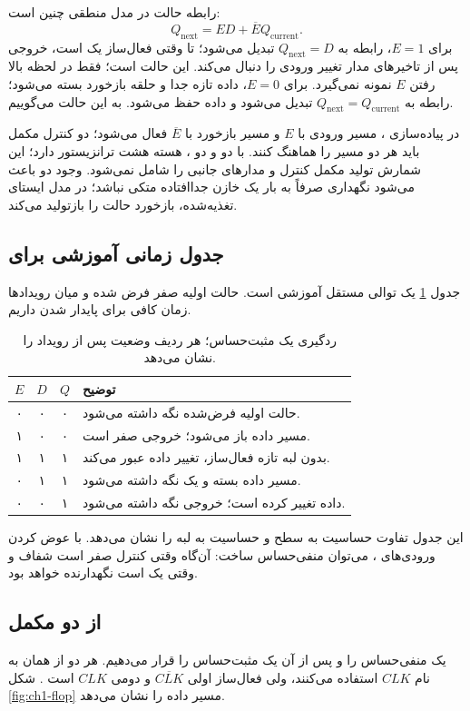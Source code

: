 رابطه حالت در مدل منطقی چنین است:
\begin{equation}\label{eq:ch1-latch}
Q_{\mathrm{next}}=ED+\overline{E}Q_{\mathrm{current}}.
\end{equation}
برای \(E=1\)، رابطه به \(Q_{\mathrm{next}}=D\) تبدیل می‌شود؛
تا وقتی فعال‌ساز یک است، خروجی پس از تاخیرهای مدار تغییر ورودی را دنبال می‌کند.
این حالت  است؛  فقط در لحظه بالا رفتن \(E\) نمونه نمی‌گیرد.
برای \(E=0\)، داده تازه جدا و حلقه بازخورد بسته می‌شود؛
رابطه به \(Q_{\mathrm{next}}=Q_{\mathrm{current}}\) تبدیل می‌شود و داده حفظ می‌شود.
به این حالت  می‌گوییم.

در پیاده‌سازی ، مسیر ورودی با \(E\) و مسیر بازخورد با \(\overline{E}\)
فعال می‌شود؛ دو کنترل مکمل باید هر دو مسیر را هماهنگ کنند.
با دو  و دو ، هسته هشت ترانزیستور دارد؛
این شمارش تولید مکمل کنترل و مدارهای جانبی را شامل نمی‌شود.
وجود دو  باعث می‌شود نگهداری صرفاً به بار یک خازن جداافتاده متکی نباشد؛
در مدل ایستای تغذیه‌شده، بازخورد حالت را بازتولید می‌کند.

\subsection{جدول زمانی آموزشی برای }
جدول \ref{tab:ch1-latch-time} یک توالی مستقل آموزشی است.
حالت اولیه صفر فرض شده و میان رویدادها زمان کافی برای پایدار شدن داریم.
\begin{table}[ht]
\centering
\caption{ردگیری یک  مثبت‌حساس؛ هر ردیف وضعیت پس از رویداد را نشان می‌دهد.}
\label{tab:ch1-latch-time}
\begin{tabular}{cccp{7cm}}
\toprule
\(E\)&\(D\)&\(Q\)&توضیح\\
\midrule
۰&۰&۰&حالت اولیه فرض‌شده نگه داشته می‌شود.\\
۱&۰&۰&مسیر داده باز می‌شود؛ خروجی صفر است.\\
۱&۱&۱&بدون لبه تازه فعال‌ساز، تغییر داده عبور می‌کند.\\
۰&۱&۱&مسیر داده بسته و یک نگه داشته می‌شود.\\
۰&۰&۱&داده تغییر کرده است؛ خروجی نگه داشته می‌شود.\\
\bottomrule
\end{tabular}
\end{table}
این جدول تفاوت حساسیت به سطح و حساسیت به لبه را نشان می‌دهد.
با عوض کردن ورودی‌های ، می‌توان  منفی‌حساس ساخت:
آن‌گاه وقتی کنترل صفر است شفاف و وقتی یک است نگهدارنده خواهد بود.

\subsection{ از دو  مکمل}
یک  منفی‌حساس را  و پس از آن یک 
مثبت‌حساس را  قرار می‌دهیم.
هر دو از همان  به نام \(CLK\) استفاده می‌کنند، ولی فعال‌ساز
اولی \(\overline{CLK}\) و دومی \(CLK\) است
\cite[شکل ]{weste}.
شکل \ref{fig:ch1-flop} مسیر داده را نشان می‌دهد.

